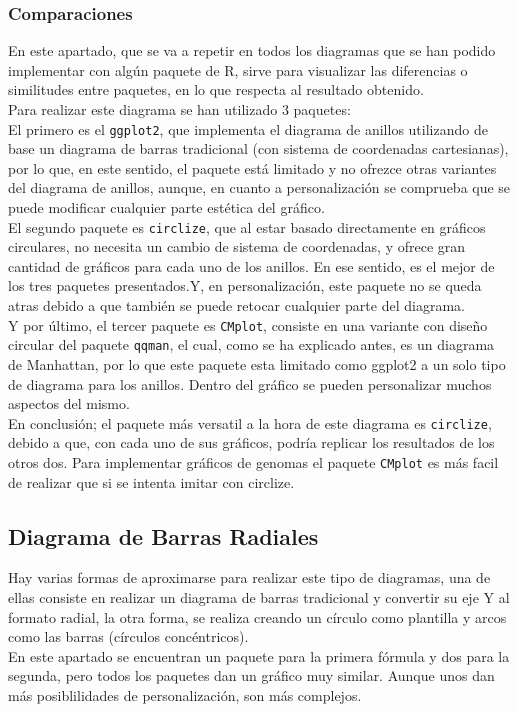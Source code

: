 \documentclass{article}\usepackage[]{graphicx}\usepackage[]{color}
\begin{document}
\subsubsection{Comparaciones}
En este apartado, que se va a repetir en todos los diagramas que se han podido implementar con alg\'un paquete de R, sirve para visualizar las diferencias o similitudes entre paquetes, en lo que respecta al resultado obtenido.~\\
Para realizar este diagrama se han utilizado 3 paquetes:~\\ 
El primero es el \texttt{ggplot2}, que implementa el diagrama de anillos utilizando de base un diagrama de barras tradicional (con sistema de coordenadas cartesianas), por lo que, en este sentido, el paquete est\'a limitado y no ofrezce otras variantes del diagrama de anillos, aunque, en cuanto a personalizaci\'on se comprueba que se puede modificar cualquier parte est\'etica del gr\'afico.~\\
El segundo paquete es \texttt{circlize}, que al estar basado directamente en gr\'aficos circulares, no necesita un cambio de sistema de coordenadas, y ofrece gran cantidad de gr\'aficos para cada uno de los anillos. En ese sentido, es el mejor de los tres paquetes presentados.Y, en personalizaci\'on, este paquete no se queda atras debido a que tambi\'en se puede retocar cualquier parte del diagrama.~\\
Y por \'ultimo, el tercer paquete es \texttt{CMplot}, consiste en una variante con dise\~no circular del paquete \texttt{qqman}, el cual, como se ha explicado antes, es un diagrama de Manhattan, por lo que este paquete esta limitado como ggplot2 a un solo tipo de diagrama para los anillos. Dentro del gr\'afico se pueden personalizar muchos aspectos del mismo.~\\
En conclusi\'on; el paquete m\'as versatil a la hora de este diagrama es \texttt{circlize}, debido a que, con cada uno de sus gr\'aficos, podr\'ia replicar los resultados de los otros dos. Para implementar gr\'aficos de genomas el paquete \texttt{CMplot} es m\'as facil de realizar que si se intenta imitar con circlize.
\clearpage
\subsection{Diagrama de Barras Radiales} \label{ssec:barrasRadiales}
Hay varias formas de aproximarse para realizar este tipo de diagramas, una de ellas consiste en realizar un diagrama de barras tradicional y convertir su eje Y al formato radial, la otra forma, se realiza creando un c\'irculo como plantilla y arcos como las barras (c\'irculos conc\'entricos).~\\
En este apartado se encuentran un paquete para la primera f\'ormula y dos para la segunda, pero todos los paquetes dan un gr\'afico muy similar. Aunque unos dan m\'as  posiblilidades de personalizaci\'on, son m\'as complejos.
\end{document}
